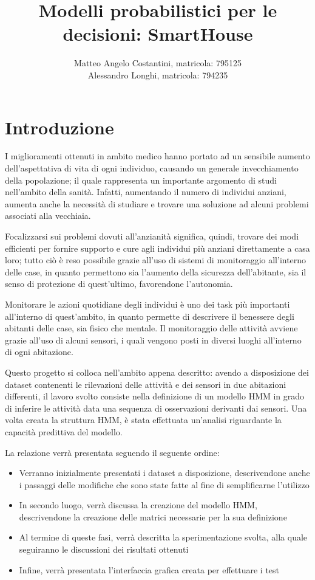 \documentclass[10pt,a4paper]{article}
\title{Modelli probabilistici per le decisioni: SmartHouse}
\author{Matteo Angelo Costantini, matricola: 795125 \\
	Alessandro Longhi, matricola: 794235}
\date{}
\begin{document}
	\maketitle
	\clearpage
	\tableofcontents
	\clearpage
	\section{Introduzione}
	I miglioramenti ottenuti in ambito medico hanno portato ad un sensibile aumento dell'aspettativa di vita di ogni individuo, causando un generale invecchiamento della popolazione; il quale rappresenta un importante argomento di studi nell'ambito della sanità. Infatti, aumentando il numero di individui anziani, aumenta anche la necessità di studiare e trovare una soluzione ad alcuni problemi associati alla vecchiaia.
	
	Focalizzarsi sui problemi dovuti all'anzianità significa, quindi, trovare dei modi efficienti per fornire supporto e cure agli individui più anziani direttamente a casa loro; tutto ciò è reso possibile grazie all'uso di sistemi di monitoraggio all'interno delle case, in quanto permettono sia l'aumento della sicurezza dell'abitante, sia il senso di protezione di quest'ultimo, favorendone l'autonomia.
	
	Monitorare le azioni quotidiane degli individui è uno dei task più importanti all'interno di quest'ambito, in quanto permette di descrivere il benessere degli abitanti delle case, sia fisico che mentale. Il monitoraggio delle attività avviene grazie all'uso di alcuni sensori, i quali vengono posti in diversi luoghi all'interno di ogni abitazione. 
	
	Questo progetto si colloca nell'ambito appena descritto: avendo a disposizione dei dataset contenenti le rilevazioni delle attività e dei sensori in due abitazioni differenti, il lavoro svolto consiste nella definizione di un modello HMM in grado di inferire le attività data una sequenza di osservazioni derivanti dai sensori. Una volta creata la struttura HMM, è stata effettuata un'analisi riguardante la capacità predittiva del modello.
	
	La relazione verrà presentata seguendo il seguente ordine:
	\begin{itemize}
	    \item Verranno inizialmente presentati i dataset a disposizione, descrivendone anche i passaggi delle modifiche che sono state fatte al fine di semplificarne l'utilizzo
	    \item In secondo luogo, verrà discussa la creazione del modello HMM, descrivendone la creazione delle matrici necessarie per la sua definizione
	    \item Al termine di queste fasi, verrà descritta la sperimentazione svolta, alla quale seguiranno le discussioni dei risultati ottenuti
	    \item Infine, verrà presentata l'interfaccia grafica creata per effettuare i test
	\end{itemize}
	
\end{document}
